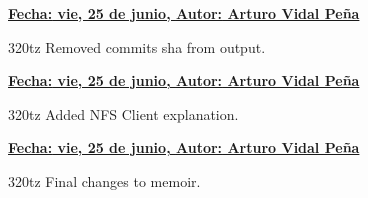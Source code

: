 \item \textbf{\underline{\underline{Fecha:} vie, 25 de junio, \underline{Autor:} Arturo Vidal Peña}}\\\item[]320tz Removed commits sha from output.\\
\item \textbf{\underline{\underline{Fecha:} vie, 25 de junio, \underline{Autor:} Arturo Vidal Peña}}\\\item[]320tz Added NFS Client explanation.\\
\item \textbf{\underline{\underline{Fecha:} vie, 25 de junio, \underline{Autor:} Arturo Vidal Peña}}\\\item[]320tz Final changes to memoir.\\
